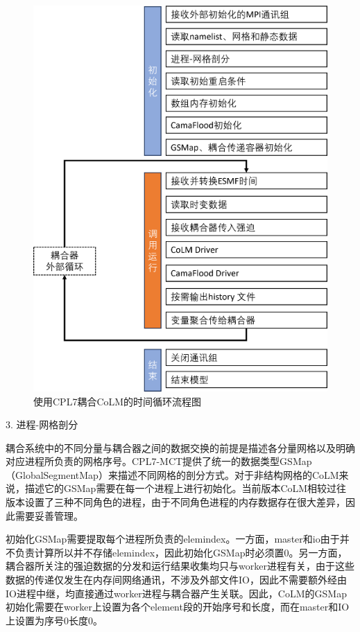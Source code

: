 {
\begin{figure}[htbp]
\centering
\includegraphics{Figures/附录/使用CPL7耦合CoLM的时间循环流程图.png}
\caption{使用CPL7耦合CoLM的时间循环流程图}
\label{fig:CoLM的时间循环流程}
\end{figure}
}

3. 进程-网格剖分

耦合系统中的不同分量与耦合器之间的数据交换的前提是描述各分量网格以及明确对应进程所负责的网格序号。CPL7-MCT提供了统一的数据类型GSMap（GlobalSegmentMap）来描述不同网格的剖分方式。对于非结构网格的CoLM来说，描述它的GSMap需要在每一个进程上进行初始化。当前版本CoLM相较过往版本设置了三种不同角色的进程，由于不同角色进程的内存数据存在很大差异，因此需要妥善管理。

初始化GSMap需要提取每个进程所负责的elemindex。一方面，master和io由于并不负责计算所以并不存储elemindex，因此初始化GSMap时必须置0。另一方面，耦合器所关注的强迫数据的分发和运行结果收集均只与worker进程有关，由于这些数据的传递仅发生在内存间网络通讯，不涉及外部文件IO，因此不需要额外经由IO进程中继，均直接通过worker进程与耦合器产生关联。因此，CoLM的GSMap初始化需要在worker上设置为各个element段的开始序号和长度，而在master和IO上设置为序号0长度0。

